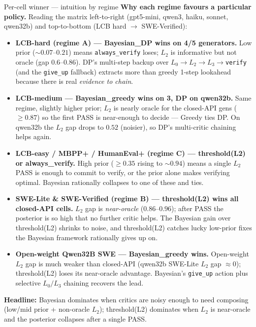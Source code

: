 \documentclass[10pt]{beamer}
\newcommand{\info}[1]{\textcolor{primaryBlue}{\textbf{#1}}}
\begin{document}
\begin{frame}{Per-cell winner --- intuition by regime}
\info{Why each regime favours a particular policy.} Reading the matrix
left-to-right (gpt5-mini, qwen3, haiku, sonnet, qwen32b) and top-to-bottom
(LCB hard $\to$ SWE-Verified):

\vspace{0.15cm}
\begin{itemize}\setlength\itemsep{4pt}
\item \textcolor{accentGreen}{\textbf{LCB-hard (regime A) --- Bayesian\_DP
wins on 4/5 generators.}} Low prior ($\sim 0.07$--$0.21$) means
\texttt{always\_verify} loses; $L_2$ is informative but not oracle
(gap $0.6$--$0.86$). DP's multi-step backup over
$L_0\!\to\! L_2\!\to\! L_3\!\to\!$\texttt{verify} (and the \texttt{give\_up}
fallback) extracts more than greedy 1-step lookahead because there is real
\emph{evidence to chain}.
\item \textcolor{accentGreen}{\textbf{LCB-medium --- Bayesian\_greedy
wins on 3, DP on qwen32b.}} Same regime, slightly higher prior; $L_2$ is
nearly oracle for the closed-API gens ($\geq 0.87$) so the first PASS is
near-enough to decide --- Greedy ties DP. On qwen32b the $L_2$ gap drops
to $0.52$ (noisier), so DP's multi-critic chaining helps again.
\item \textcolor{accentTeal}{\textbf{LCB-easy / MBPP+ / HumanEval+ (regime C)
--- threshold(L2) or always\_verify.}} High prior ($\geq 0.35$ rising to
$\sim 0.94$) means a single $L_2$ PASS is enough to commit to verify, or
the prior alone makes verifying optimal. Bayesian rationally collapses
to one of these and ties.
\item \textcolor{accentOrange}{\textbf{SWE-Lite \& SWE-Verified (regime B)
--- threshold(L2) wins all closed-API cells.}} $L_2$ gap is
\emph{near-oracle} ($0.86$--$0.96$); after PASS the posterior is so high
that no further critic helps. The Bayesian gain over threshold(L2)
shrinks to noise, and threshold(L2) catches lucky low-prior fixes the
Bayesian framework rationally gives up on.
\item \textcolor{accentPurple}{\textbf{Open-weight Qwen32B SWE ---
Bayesian\_greedy wins.}} Open-weight $L_2$ gap is much weaker than
closed-API (qwen32b SWE-Lite $L_2$ gap $\approx 0$); threshold(L2) loses
its near-oracle advantage. Bayesian's \texttt{give\_up} action plus
selective $L_0/L_3$ chaining recovers the lead.
\end{itemize}

\textcolor{softGrey}{\scriptsize \textbf{Headline:} Bayesian dominates
when critics are noisy enough to need composing (low/mid prior + non-oracle
$L_2$); threshold(L2) dominates when $L_2$ is near-oracle and the
posterior collapses after a single PASS.}
\end{frame}
\end{document}
